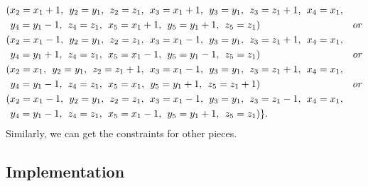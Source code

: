 \begin{align*}
&(x_{2}=x_{1}+1,\hspace{1ex} y_{2}=y_{1},\hspace{1ex} z_{2}=z_{1},\hspace{1ex} x_{3}=x_{1}+1,\hspace{1ex} y_{3}=y_{1},\hspace{1ex} z_{3}=z_{1}+1,\hspace{1ex} x_{4}=x_{1},\\
&\hspace{1ex} y_{4}=y_{1}-1,\hspace{1ex} z_{4}=z_{1},\hspace{1ex} x_{5}=x_{1}+1,\hspace{1ex} y_{5}=y_{1}+1,\hspace{1ex} z_{5}=z_{1})&or\\ 
&(x_{2}=x_{1}-1,\hspace{1ex} y_{2}=y_{1},\hspace{1ex} z_{2}=z_{1},\hspace{1ex} x_{3}=x_{1}-1,\hspace{1ex} y_{3}=y_{1},\hspace{1ex} z_{3}=z_{1}+1,\hspace{1ex} x_{4}=x_{1},\\
&\hspace{1ex} y_{4}=y_{1}+1,\hspace{1ex} z_{4}=z_{1},\hspace{1ex} x_{5}=x_{1}-1,\hspace{1ex} y_{5}=y_{1}-1,\hspace{1ex} z_{5}=z_{1})&or\\ 
&(x_{2}=x_{1},\hspace{1ex} y_{2}=y_{1},\hspace{1ex} z_{2}=z_{1}+1,\hspace{1ex} x_{3}=x_{1}-1,\hspace{1ex} y_{3}=y_{1},\hspace{1ex} z_{3}=z_{1}+1,\hspace{1ex} x_{4}=x_{1},\\
&\hspace{1ex} y_{4}=y_{1}-1,\hspace{1ex} z_{4}=z_{1},\hspace{1ex} x_{5}=x_{1},\hspace{1ex} y_{5}=y_{1}+1,\hspace{1ex} z_{5}=z_{1}+1)&or\\ 
&(x_{2}=x_{1}-1,\hspace{1ex} y_{2}=y_{1},\hspace{1ex} z_{2}=z_{1},\hspace{1ex} x_{3}=x_{1}-1,\hspace{1ex} y_{3}=y_{1},\hspace{1ex} z_{3}=z_{1}-1,\hspace{1ex} x_{4}=x_{1},\\
&\hspace{1ex} y_{4}=y_{1}-1,\hspace{1ex} z_{4}=z_{1},\hspace{1ex} x_{5}=x_{1}-1,\hspace{1ex} y_{5}=y_{1}+1,\hspace{1ex} z_{5}=z_{1})\}.
\end{align*}
Similarly, we can get the constraints for other pieces.
\subsection{Implementation}